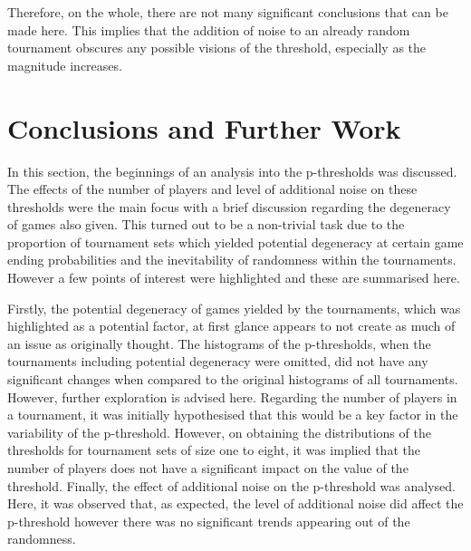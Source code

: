 Therefore, on the whole, there
are not many significant conclusions that can be made here. This implies that
the addition of noise to an already random tournament obscures any possible
visions of the threshold, especially as the magnitude increases.


\section{Conclusions and Further Work}\label{sec:Conclusions_and_Further_Work}
In this section, the beginnings of an analysis into the p-thresholds was
discussed. The effects of the number of players and level of additional noise on
these thresholds were the main focus with a brief discussion regarding the
degeneracy of games also given. This turned out to be a non-trivial task due to
the proportion of tournament sets which yielded potential degeneracy at certain
game ending probabilities and the inevitability of randomness within the
tournaments. However a few points of interest were highlighted and these are
summarised here. 

Firstly, the potential degeneracy of games yielded by the tournaments, which was
highlighted as a potential factor, at first glance appears to not create as much
of an issue as originally thought. The histograms of the p-thresholds, when the
tournaments including potential degeneracy were omitted, did not have any
significant changes when compared to the original histograms of all tournaments.
However, further exploration is advised here. Regarding the number of players in
a tournament, it was initially hypothesised that this would be a key factor in
the variability of the p-threshold. However, on obtaining the distributions of
the thresholds for tournament sets of size one
to eight, it was implied that the number of players does not have a significant
impact on the value of the threshold. Finally, the effect of additional noise on
the p-threshold was analysed. Here, it was observed that, as expected, the level
of additional noise did affect the p-threshold however there was no significant
trends appearing out of the randomness.

